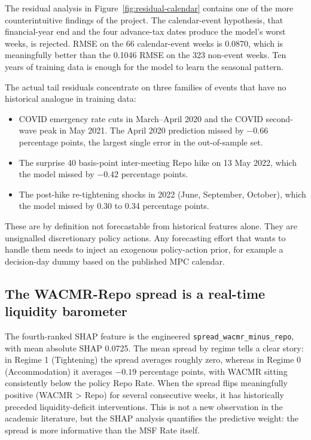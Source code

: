 The residual analysis in Figure~\ref{fig:residual-calendar} contains
one of the more counterintuitive findings of the project. The
calendar-event hypothesis, that financial-year end and the four
advance-tax dates produce the model's worst weeks, is rejected. RMSE
on the 66 calendar-event weeks is 0.0870, which is meaningfully
better than the 0.1046 RMSE on the 323 non-event weeks. Ten years of
training data is enough for the model to learn the seasonal pattern.

The actual tail residuals concentrate on three families of events
that have no historical analogue in training data:

\begin{itemize}
\item COVID emergency rate cuts in March--April 2020 and the COVID
  second-wave peak in May 2021. The April 2020 prediction missed by
  $-0.66$ percentage points, the largest single error in the
  out-of-sample set.
\item The surprise 40 basis-point inter-meeting Repo hike on 13 May
  2022, which the model missed by $-0.42$ percentage points.
\item The post-hike re-tightening shocks in 2022 (June, September,
  October), which the model missed by 0.30 to 0.34 percentage points.
\end{itemize}

These are by definition not forecastable from historical features
alone. They are unsignalled discretionary policy actions. Any
forecasting effort that wants to handle them needs to inject an
exogenous policy-action prior, for example a decision-day dummy
based on the published MPC calendar.

\subsection{The WACMR-Repo spread is a real-time liquidity barometer}

The fourth-ranked SHAP feature is the engineered
\texttt{spread\_wacmr\_minus\_repo}, with mean absolute SHAP 0.0725.
The mean spread by regime tells a clear story: in Regime 1
(Tightening) the spread averages roughly zero, whereas in Regime 0
(Accommodation) it averages $-0.19$ percentage points, with WACMR
sitting consistently below the policy Repo Rate. When the spread
flips meaningfully positive (WACMR > Repo) for several consecutive
weeks, it has historically preceded liquidity-deficit interventions.
This is not a new observation in the academic literature, but the
SHAP analysis quantifies the predictive weight: the spread is more
informative than the MSF Rate itself.

